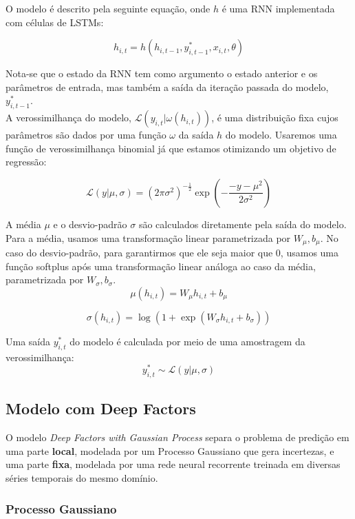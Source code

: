 O modelo é descrito pela seguinte equação, onde $h$ é uma RNN implementada com células de LSTMs:

\[
h_{i,t} = h(h_{i,t-1},y^*_{i,t-1},x_{i,t}, \theta)
\]

Nota-se que o estado da RNN tem como argumento o estado anterior e os parâmetros de entrada, mas também a saída da iteração passada do modelo, $y^*_{i,t-1}$. \\

A verossimilhança do modelo, $\mathcal{L}(y_{i,t} | \omega(h_{i,t}))$, é uma distribuição fixa cujos parâmetros são dados por uma função $\omega$ da saída $h$ do modelo. Usaremos uma função de verossimilhança binomial já que estamos otimizando um objetivo de regressão:

\[
\mathcal{L}(y | \mu,\sigma) = {(2\pi\sigma^2)}^{-\frac{1}{2}} \exp(-  \frac{-y - \mu^2}{2\sigma^2})  
\]

A média $\mu$ e o desvio-padrão $\sigma$ são calculados diretamente pela saída do modelo. Para a média, usamos uma transformação linear parametrizada por $W_{\mu},b_{\mu}$. No caso do desvio-padrão, para garantirmos que ele seja maior que 0, usamos uma função softplus após uma transformação linear análoga ao caso da média, parametrizada por  $W_{\sigma},b_{\sigma}$.\\

\[ \mu(h_{i,t}) = W_{\mu}h_{i,t} + b_{\mu} \]

\[ \sigma(h_{i,t}) = \log(1 + \exp(W_{\sigma}h_{i,t}+ b_{\sigma})) \]

Uma saída $y^*_{i,t}$ do modelo é calculada por meio de uma amostragem da verossimilhança: \\

\[
 y^*_{i,t} \sim \mathcal{L}(y | \mu,\sigma) 
\]

\subsection{Modelo com Deep Factors}

O modelo \textit{Deep Factors with Gaussian Process} \cite{deepfactors} separa o problema de predição em uma parte \textbf{local}, modelada por um Processo Gaussiano que gera incertezas, e uma parte \textbf{fixa}, modelada por uma rede neural recorrente treinada em diversas séries temporais do mesmo domínio.

\subsubsection{Processo Gaussiano}

